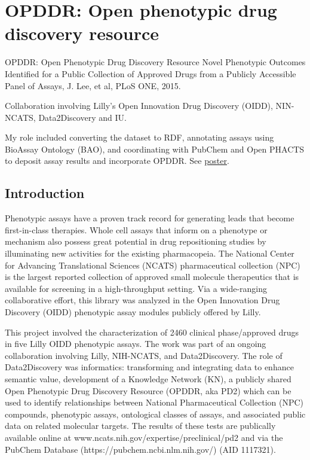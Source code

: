 \section{OPDDR: Open phenotypic drug discovery resource}

OPDDR: Open Phenotypic Drug Discovery Resource
Novel Phenotypic Outcomes Identified for a Public Collection of Approved Drugs from a Publicly Accessible Panel of Assays, J. Lee, et al, PLoS ONE, 2015\cite{Lee2015-vg}.

Collaboration involving Lilly's Open Innovation Drug Discovery (OIDD), NIN-NCATS, Data2Discovery and IU.  

My role included converting the dataset to RDF,  annotating assays using BioAssay Ontology (BAO), and coordinating with PubChem and Open PHACTS to deposit assay results and incorporate OPDDR.
See \href{https://zenodo.org/record/4844529}{poster}.

\subsection{Introduction}

Phenotypic assays have a proven track record for generating leads that become first-in-class therapies. Whole cell assays that inform on a phenotype or mechanism also possess great potential in drug repositioning studies by illuminating new activities for the existing pharmacopeia. The National Center for Advancing Translational Sciences (NCATS) pharmaceutical collection (NPC) is the largest reported collection of approved small molecule therapeutics that is available for screening in a high-throughput setting. Via a wide-ranging collaborative effort, this library was analyzed in the Open Innovation Drug Discovery (OIDD) phenotypic assay modules publicly offered by Lilly. 

This project involved the characterization of 2460 clinical phase/approved drugs in five Lilly OIDD phenotypic assays. The work was part of an ongoing collaboration involving Lilly, NIH-NCATS, and Data2Discovery.  The role of Data2Discovery was informatics: transforming and integrating data to enhance semantic value, development of a Knowledge Network (KN), a publicly shared Open Phenotypic Drug Discovery Resource (OPDDR, aka PD2) which can be used to identify relationships between National Pharmaceutical Collection (NPC) compounds, phenotypic assays, ontological classes of assays, and associated public data on related molecular targets. The results of these tests are publically available online at www.ncats.nih.gov/expertise/preclinical/pd2 and via the PubChem Database (https://pubchem.ncbi.nlm.nih.gov/) (AID 1117321).

